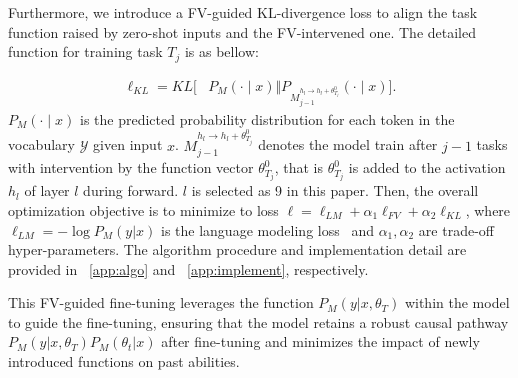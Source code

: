 Furthermore, we introduce a FV-guided KL-divergence loss to align the task function raised by zero-shot inputs and the FV-intervened one. The detailed function for training task $T_j$ is as bellow:

\begin{equation}
\begin{aligned}
    \ell_{KL} = KL[&P_M(\cdot \mid x) \Vert 
    P_{M_{j-1}^{{h_{l}\rightarrow h_{l}+\theta_{T_j}^0}}}(\cdot \mid x)].
\end{aligned}
\end{equation}
$P_M(\cdot \mid x)$ is the predicted probability distribution for each token in the vocabulary $\mathcal{Y}$ given input $x$. $M_{j-1}^{{h_{l}\rightarrow h_{l}+\theta_{T_j}^0}}$ denotes the model train after $j-1$ tasks with intervention by the function vector $\theta_{T_j}^0$, that is  $\theta_{T_j}^0$ is added to the activation $h_{l}$ of layer $l$ during forward. $l$ is selected as 9 in this paper.
Then, the overall optimization objective is to minimize to loss $\ell = \ell_{LM} + \alpha_1 \ell_{FV} + \alpha_2 \ell_{KL}$, where $\ell_{LM} = -\log P_M(y|x)$ is the language modeling loss~\citep{brown2020language} and $\alpha_1, \alpha_2$ are trade-off hyper-parameters. The algorithm procedure and implementation detail are provided in ~\ref{app:algo} and ~\ref{app:implement}, respectively. 

This FV-guided fine-tuning leverages the function \(P_M(y|x,\theta_T)\) within the model to guide the fine-tuning, ensuring that the model retains a robust causal pathway \(P_M(y|x,\theta_T)P_M(\theta_t|x)\) after fine-tuning and minimizes the impact of newly introduced functions on past abilities.





